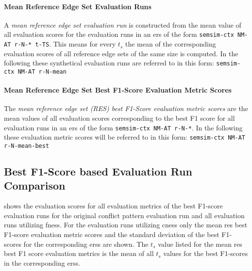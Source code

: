 \documentclass[11pt, numbers=noenddot]{scrreprt}
\begin{document}
\paragraph{Mean Reference Edge Set Evaluation Runs}
A \textit{mean reference edge set evaluation run} is constructed from the mean value of all evaluation scores for the evaluation runs in an \gls{ers} of the form \texttt{semsim-ctx NM-AT r-N-* t-TS}. This means for every \(t_s\) the mean of the corresponding evaluation scores of all reference edge sets of the same size is computed. In the following these synthetical evaluation runs are referred to in this form: \texttt{semsim-ctx NM-AT r-N-mean}

\paragraph{Mean Reference Edge Set Best F1-Score Evaluation Metric Scores}
The \textit{mean reference edge set (RES) best F1-Score evaluation metric scores} are the mean values of all evaluation scores corresponding to the best F1 score for all evaluation runs in an \gls{ers} of the form \texttt{semsim-ctx NM-AT r-N-*}. In the following these evaluation metric scores will be referred to in this form: \texttt{semsim-ctx NM-AT r-N-mean-best}



\subsection{Best F1-Score based Evaluation Run Comparison}
\label{sec:best-f1-score-eval-run-comparison}
 shows the evaluation scores for all evaluation metrics of the best F1-score evaluation runs for the original conflict pattern evaluation run and all evaluation runs utilizing \gls{fness}. For the evaluation runs utilizing \gls{cness} only the mean \gls{res} best F1-score evaluation metric scores and the standard deviation of the best F1-scores for the corresponding \gls{ers}s are shown. The \(t_s\) value listed for the mean \gls{res} best F1 score evaluation metrics is the mean of all \(t_s\) values for the best F1-scores in the corresponding \gls{ers}s.
\end{document}
